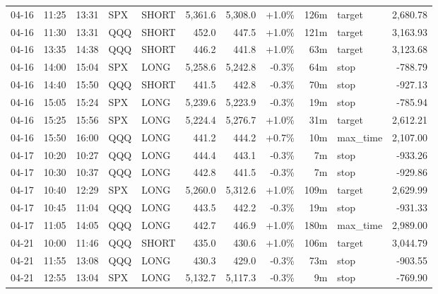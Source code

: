 \documentclass[11pt,a4paper,twoside]{article}
\begin{document}
\begin{center}
\begin{longtable}{>{\color{txtmain}}l l l l l r r r r >{\color{txtmain}}l r}
04-16 & 11:25 & 13:31 & SPX & SHORT & 5,361.6 & 5,308.0 & \textcolor{wingreen}{+1.0\%} & 126m & target & \textcolor{wingreen}{2,680.78} \\
04-16 & 11:30 & 13:31 & QQQ & SHORT & 452.0 & 447.5 & \textcolor{wingreen}{+1.0\%} & 121m & target & \textcolor{wingreen}{3,163.93} \\
04-16 & 13:35 & 14:38 & QQQ & SHORT & 446.2 & 441.8 & \textcolor{wingreen}{+1.0\%} & 63m & target & \textcolor{wingreen}{3,123.68} \\
04-16 & 14:00 & 15:04 & SPX & LONG & 5,258.6 & 5,242.8 & \textcolor{lossred}{-0.3\%} & 64m & stop & \textcolor{lossred}{-788.79} \\
04-16 & 14:40 & 15:50 & QQQ & SHORT & 441.5 & 442.8 & \textcolor{lossred}{-0.3\%} & 70m & stop & \textcolor{lossred}{-927.13} \\
04-16 & 15:05 & 15:24 & SPX & LONG & 5,239.6 & 5,223.9 & \textcolor{lossred}{-0.3\%} & 19m & stop & \textcolor{lossred}{-785.94} \\
04-16 & 15:25 & 15:56 & SPX & LONG & 5,224.4 & 5,276.7 & \textcolor{wingreen}{+1.0\%} & 31m & target & \textcolor{wingreen}{2,612.21} \\
04-16 & 15:50 & 16:00 & QQQ & LONG & 441.2 & 444.2 & \textcolor{wingreen}{+0.7\%} & 10m & max\_time & \textcolor{wingreen}{2,107.00} \\
04-17 & 10:20 & 10:27 & QQQ & LONG & 444.4 & 443.1 & \textcolor{lossred}{-0.3\%} & 7m & stop & \textcolor{lossred}{-933.26} \\
04-17 & 10:30 & 10:37 & QQQ & LONG & 442.8 & 441.5 & \textcolor{lossred}{-0.3\%} & 7m & stop & \textcolor{lossred}{-929.86} \\
04-17 & 10:40 & 12:29 & SPX & LONG & 5,260.0 & 5,312.6 & \textcolor{wingreen}{+1.0\%} & 109m & target & \textcolor{wingreen}{2,629.99} \\
04-17 & 10:45 & 11:04 & QQQ & LONG & 443.5 & 442.2 & \textcolor{lossred}{-0.3\%} & 19m & stop & \textcolor{lossred}{-931.33} \\
04-17 & 11:05 & 14:05 & QQQ & LONG & 442.7 & 446.9 & \textcolor{wingreen}{+1.0\%} & 180m & max\_time & \textcolor{wingreen}{2,989.00} \\
04-21 & 10:00 & 11:46 & QQQ & SHORT & 435.0 & 430.6 & \textcolor{wingreen}{+1.0\%} & 106m & target & \textcolor{wingreen}{3,044.79} \\
04-21 & 11:55 & 13:08 & QQQ & LONG & 430.3 & 429.0 & \textcolor{lossred}{-0.3\%} & 73m & stop & \textcolor{lossred}{-903.55} \\
04-21 & 12:55 & 13:04 & SPX & LONG & 5,132.7 & 5,117.3 & \textcolor{lossred}{-0.3\%} & 9m & stop & \textcolor{lossred}{-769.90} \\

\end{longtable}
\end{center}
\end{document}
